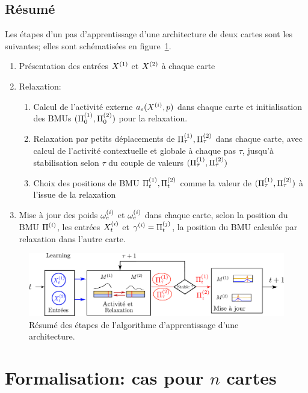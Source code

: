 \subsection{Résumé}
Les étapes d'un pas d'apprentissage d'une architecture de deux cartes sont les suivantes; elles sont schématisées en figure~\ref{fig:algo}.
\begin{enumerate}
\item Présentation des entrées $X^{({1})}$ et $X^{({2})}$ à chaque carte
\item Relaxation:
\begin{enumerate}
\item Calcul de l'activité externe $a_e(X^{({i})},p)$ dans chaque carte et initialisation des BMUs $(\Pi^{({1})}_0,\Pi^{({2})}_0)$ pour la relaxation.
\item Relaxation par petits déplacements de $\Pi^{({1})}_\tau,\Pi^{({2})}_\tau$ dans chaque carte, avec calcul de l'activité contextuelle et globale à chaque pas $\tau$, jusqu'à stabilisation selon $\tau$ du couple de valeurs $(\Pi^{({1})}_\tau,\Pi^{({2})}_\tau)$
\item Choix des positions de BMU $\Pi^{({1})}_t,\Pi^{({2})}_t$ comme la valeur de $(\Pi^{({1})}_\tau,\Pi^{({2})}_\tau)$ à l'issue de la relaxation
\end{enumerate}
\item Mise à jour des poids $\omega_{e}^{({i})}$ et $\omega_{c}^{({i})}$ dans chaque carte, selon la position du BMU $\Pi^{({i})}$, les entrées $X^{({i})}_t$ et $\gamma^{({i})} = \Pi^{({j})}_t$, la position du BMU calculée par relaxation dans l'autre carte.
\end{enumerate}

\begin{figure}
\centering
\includegraphics[width=\textwidth]{learning_tests_2maps}
\caption{Résumé des étapes de l'algorithme d'apprentissage d'une architecture.}
\label{fig:algo}
\end{figure}





\section{Formalisation: cas pour $n$ cartes}\label{sec:formalisme}

